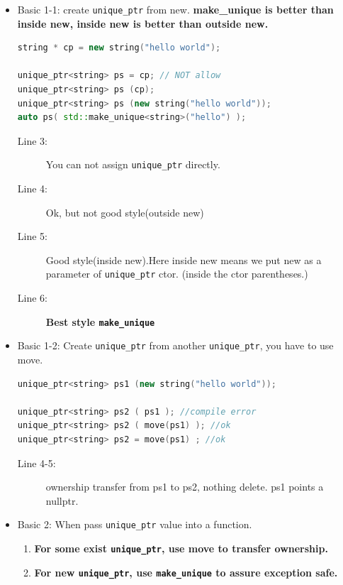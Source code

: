 \documentclass[a4paper,11pt,twoside]{book}
\begin{document}
\begin{itemize}

\item Basic 1-1: create \texttt{unique\_ptr} from new. \textbf{make\_unique is better than inside new, inside new is better than outside new.}
\begin{lstlisting}[frame=single, language=c++]
string * cp = new string("hello world");

unique_ptr<string> ps = cp; // NOT allow
unique_ptr<string> ps (cp);
unique_ptr<string> ps (new string("hello world"));
auto ps( std::make_unique<string>("hello") );
\end{lstlisting}
\begin{description}
	\item[Line 3:] You can not assign \texttt{unique\_ptr} directly.
	\item[Line 4:] Ok, but not good style(outside new)
	\item[Line 5:] Good style(inside new).Here inside new means we put new as a parameter of \texttt{unique\_ptr} ctor. (inside the ctor parentheses.)
	\item[Line 6:] \textbf{Best style \texttt{make\_unique} }
\end{description}

\item Basic 1-2: Create \texttt{unique\_ptr} from another \texttt{unique\_ptr}, you have to use move.
\begin{lstlisting}[frame=single, language=c++]
unique_ptr<string> ps1 (new string("hello world"));

unique_ptr<string> ps2 ( ps1 ); //compile error
unique_ptr<string> ps2 ( move(ps1) ); //ok
unique_ptr<string> ps2 = move(ps1) ; //ok
\end{lstlisting}
\begin{description}
	\item[Line 4-5:] ownership transfer from ps1 to ps2, nothing delete. ps1 points a nullptr.
\end{description}

\item Basic 2: When pass \texttt{unique\_ptr} value into a function.
\begin{enumerate}
	\item \textbf{For some exist \texttt{unique\_ptr}, use move to transfer ownership.}
	\item \textbf{For new \texttt{unique\_ptr}, use \texttt{make\_unique} to assure exception safe.}	
\end{enumerate}



\end{itemize}
\end{document}
